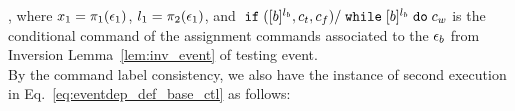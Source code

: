 \begin{subproof}
, where $x_1 = \pi_1(\mathtt{\epsilon}_1)$, $l_1 = {\pi_2(\mathtt{\epsilon}_1)}$, 
and $\;\mathtt{if}\; ([b]^{l_b}, c_t, c_f) / \;\mathtt{while}\; [b]^{l_b} \;\mathtt{do}\; c_w$ 
is the conditional command of the assignment commands 
associated to the $\mathtt{\epsilon}_b$ from Inversion Lemma~\ref{lem:inv_event} of testing event.
\\
%
By the command label consistency,
we also have the instance of second execution in Eq.~\ref{eq:eventdep_def_base_ctl} as follows:
\begin{equation}
\label{eq:ctldep_inv2}

\end{equation}
\end{subproof}

